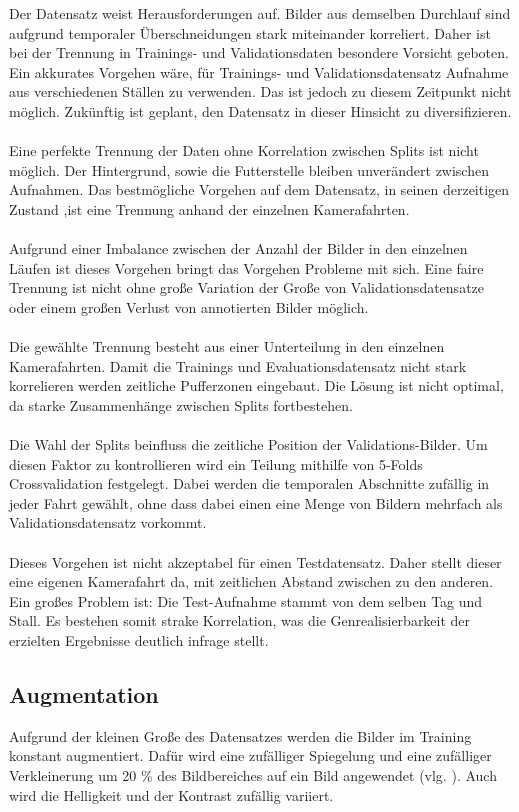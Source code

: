 \documentclass[12pt,DIV=15,BCOR=15mm,twoside,headsepline,abstract=true,listof=totoc,bibliography=totoc]{scrreprt}
\theoremstyle{remark}    %
\begin{document}
    Der Datensatz weist Herausforderungen auf. Bilder aus demselben Durchlauf sind aufgrund temporaler Überschneidungen stark miteinander korreliert.
    Daher ist bei der Trennung in Trainings- und Validationsdaten besondere Vorsicht geboten.
    Ein akkurates Vorgehen wäre, für Trainings- und Validationsdatensatz Aufnahme aus verschiedenen Ställen zu verwenden. Das ist jedoch zu diesem
    Zeitpunkt nicht möglich. Zukünftig ist geplant, den Datensatz in dieser Hinsicht zu diversifizieren.\\\\
    Eine perfekte Trennung der Daten ohne Korrelation zwischen Splits ist nicht möglich. Der Hintergrund, sowie die Futterstelle bleiben unverändert 
    zwischen Aufnahmen. Das bestmögliche Vorgehen auf dem Datensatz, in seinen derzeitigen Zustand ,ist eine Trennung anhand der einzelnen Kamerafahrten.\\\\
    Aufgrund einer Imbalance zwischen der Anzahl der Bilder in den einzelnen Läufen ist dieses Vorgehen bringt das Vorgehen Probleme mit sich.
    Eine faire Trennung ist nicht ohne große Variation der Große von Validationsdatensatze oder einem großen Verlust von annotierten Bilder möglich.\\\\
    Die gewählte Trennung besteht aus einer Unterteilung in den einzelnen Kamerafahrten. Damit die Trainings und
    Evaluationsdatensatz nicht stark korrelieren werden zeitliche Pufferzonen eingebaut. Die Lösung ist nicht optimal, da starke Zusammenhänge 
    zwischen Splits fortbestehen.\\\\
    Die Wahl der Splits beinfluss die zeitliche Position der Validations-Bilder. Um diesen Faktor zu kontrollieren wird
    ein Teilung mithilfe von 5-Folds Crossvalidation festgelegt. Dabei werden die temporalen Abschnitte zufällig in jeder Fahrt gewählt, ohne dass dabei
    einen eine Menge von Bildern mehrfach als Validationsdatensatz vorkommt.\\\\
    Dieses Vorgehen ist nicht akzeptabel für einen Testdatensatz. Daher stellt dieser eine eigenen Kamerafahrt da, mit zeitlichen Abstand zwischen zu den anderen. 
    Ein großes Problem ist: Die Test-Aufnahme stammt von dem selben Tag und Stall. Es bestehen somit strake Korrelation, was die Genrealisierbarkeit der erzielten Ergebnisse 
    deutlich infrage stellt.

    \subsection{Augmentation}
    Aufgrund der kleinen Große des Datensatzes werden die Bilder im Training konstant augmentiert. Dafür wird eine zufälliger Spiegelung und eine zufälliger
    Verkleinerung um 20 \% des Bildbereiches auf ein Bild angewendet (vlg. \cite{chen2017rethinkingatrousconvolutionsemantic,HaitzHuebnerUlrich2022}).  
    Auch wird die Helligkeit und der Kontrast zufällig variiert. 
\end{document}

